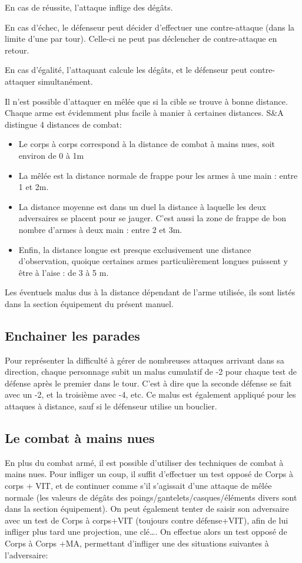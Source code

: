 \documentclass[10pt,a4paper,twocolumn]{book}
\begin{document}
    En cas de réussite, l’attaque inflige des dégâts.
    
    En cas d’échec, le défenseur peut décider d’effectuer une contre-attaque (dans la limite d’une par tour). Celle-ci ne peut pas déclencher de contre-attaque en retour.
    
    En cas d’égalité, l’attaquant calcule les dégâts, et le défenseur peut contre-attaquer simultanément.
    
    Il n’est possible d’attaquer en mêlée que si la cible se trouve à bonne distance. Chaque arme est évidemment plus facile à manier à certaines distances. S\&A distingue 4 distances de combat:
    \begin{itemize}
    \item{}Le corps à corps correspond à la distance de combat à mains nues, soit environ de 0 à 1m
\item{}La mêlée est la distance normale de frappe pour les armes à une main : entre 1 et 2m.
\item{}La distance moyenne est dans un duel la distance à laquelle les deux adversaires se placent pour se jauger. C’est aussi la zone de frappe de bon nombre d’armes à deux main : entre 2 et 3m.
\item{}Enfin, la distance longue est presque exclusivement une distance d’observation, quoique certaines armes particulièrement longues puissent y être à l’aise : de 3 à 5 m.
    \end{itemize}

Les éventuels malus dus à la distance dépendant de l’arme utilisée, ils sont listés dans la section équipement du présent manuel.
\subsection*{Enchainer les parades}
Pour représenter la difficulté à gérer de nombreuses attaques arrivant dans sa direction, chaque personnage subit un malus cumulatif de -2 pour chaque test de défense après le premier dans le tour. C’est à dire que la seconde défense se fait avec un -2, et la troisième avec -4, etc. Ce malus est également appliqué pour les attaques à distance, sauf si le défenseur utilise un bouclier.
\subsection*{Le combat à mains nues}
En plus du combat armé, il est possible d’utiliser des techniques de combat à mains nues.
Pour infliger un coup, il suffit d’effectuer un test opposé de Corps à corps + VIT, et de continuer comme s’il s’agissait d’une attaque de mêlée normale (les valeurs de dégâts des poings/gantelets/casques/éléments divers sont dans la section équipement).
On peut également tenter de saisir son adversaire avec un test de Corps à corps+VIT (toujours contre défense+VIT), afin de lui infliger plus tard une projection, une clé….
On effectue alors un test opposé de Corps à Corps +MA, permettant d’infliger une des situations suivantes à l’adversaire:
\end{document}
